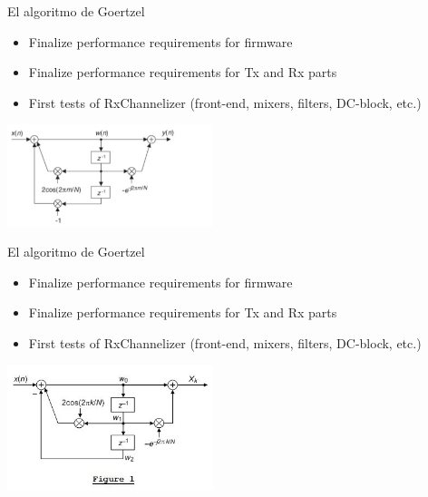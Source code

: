 \documentclass[ignorenonframetext,12pt]{beamer}
\begin{document}
\begin{frame}{El algoritmo de Goertzel}
				\begin{itemize}
								\item Finalize performance requirements for firmware 
								\item Finalize performance requirements for Tx and Rx parts 
								\item First tests of RxChannelizer (front-end, mixers, filters,
												DC-block, etc.)
				\end{itemize}
								\centering
								\includegraphics[width=0.45\textwidth]{goertzel_algo}
\end{frame}

\begin{frame}{El algoritmo de Goertzel}
				\begin{itemize}
								\item Finalize performance requirements for firmware 
								\item Finalize performance requirements for Tx and Rx parts 
								\item First tests of RxChannelizer (front-end, mixers, filters,
												DC-block, etc.)
				\end{itemize}
								\centering
								\includegraphics[width=0.45\textwidth]{goertzel_non_integer_figure1}
\end{frame}
\end{document}
